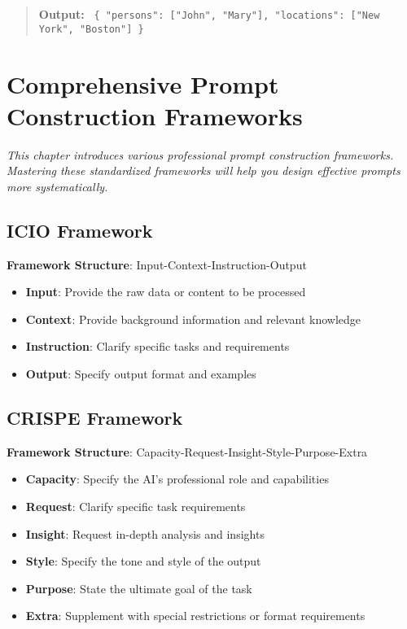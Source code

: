 \documentclass[12pt]{article}
\newcommand{\modeloutput}[1]{\begin{quote}\textbf{Output:} #1\end{quote}}
\newcommand{\chapternote}[1]{\textit{\small #1}}
\begin{document}
\modeloutput{\texttt{
\{
  "persons": ["John", "Mary"],
  "locations": ["New York", "Boston"]
\}
}}

\section{Comprehensive Prompt Construction Frameworks}
\chapternote{This chapter introduces various professional prompt construction frameworks. Mastering these standardized frameworks will help you design effective prompts more systematically.}

\subsection{ICIO Framework}
\textbf{Framework Structure}: Input-Context-Instruction-Output
\begin{itemize}
  \item \textbf{Input}: Provide the raw data or content to be processed
  \item \textbf{Context}: Provide background information and relevant knowledge
  \item \textbf{Instruction}: Clarify specific tasks and requirements
  \item \textbf{Output}: Specify output format and examples
\end{itemize}

\subsection{CRISPE Framework}
\textbf{Framework Structure}: Capacity-Request-Insight-Style-Purpose-Extra
\begin{itemize}
  \item \textbf{Capacity}: Specify the AI's professional role and capabilities
  \item \textbf{Request}: Clarify specific task requirements
  \item \textbf{Insight}: Request in-depth analysis and insights
  \item \textbf{Style}: Specify the tone and style of the output
  \item \textbf{Purpose}: State the ultimate goal of the task
  \item \textbf{Extra}: Supplement with special restrictions or format requirements
\end{itemize}
\end{document}
